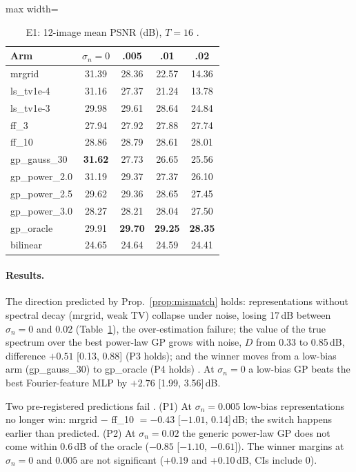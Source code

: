 \begin{table}[t]\centering\small
\caption{E1: 12-image mean PSNR (dB), $T=16$ .}\label{tab:e1}
\begin{adjustbox}{max width=\linewidth}\begin{tabular}{lcccc}\toprule
Arm & $\sigma_n{=}0$ & .005 & .01 & .02\\\midrule
mrgrid & 31.39 & 28.36 & 22.57 & 14.36\\
ls\_tv1e-4 & 31.16 & 27.37 & 21.24 & 13.78\\
ls\_tv1e-3 & 29.98 & 29.61 & 28.64 & 24.84\\
ff\_3 & 27.94 & 27.92 & 27.88 & 27.74\\
ff\_10 & 28.86 & 28.79 & 28.61 & 28.01\\
gp\_gauss\_30 & \textbf{31.62} & 27.73 & 26.65 & 25.56\\
gp\_power\_2.0 & 31.19 & 29.37 & 27.37 & 26.10\\
gp\_power\_2.5 & 29.62 & 29.36 & 28.65 & 27.45\\
gp\_power\_3.0 & 28.27 & 28.21 & 28.04 & 27.50\\
gp\_oracle & 29.91 & \textbf{29.70} & \textbf{29.25} & \textbf{28.35}\\
bilinear & 24.65 & 24.64 & 24.59 & 24.41\\
\bottomrule\end{tabular}\end{adjustbox}
\end{table}

\paragraph{Results.} The direction predicted by Prop.~\ref{prop:mismatch}
holds: representations without spectral decay (mrgrid, weak TV) collapse
under noise, losing 17\,dB between $\sigma_n=0$ and $0.02$
(Table~\ref{tab:e1}), the over-estimation failure; the value of the true
spectrum over the best power-law GP grows with noise, $D$ from 0.33 to
0.85\,dB, difference $+0.51$ [0.13, 0.88] (P3 holds); and the winner moves
from a low-bias arm (gp\_gauss\_30) to gp\_oracle (P4 holds)
. At $\sigma_n=0$ a low-bias GP beats the best
Fourier-feature MLP by $+2.76$ [1.99, 3.56]\,dB.

Two pre-registered predictions fail . (P1) At
$\sigma_n=0.005$ low-bias representations no longer win: mrgrid $-$ ff\_10 $=
-0.43$ [$-1.01$, 0.14]\,dB; the switch happens earlier than predicted.
(P2) At $\sigma_n=0.02$ the generic power-law GP does not come within 0.6\,dB of
the oracle ($-0.85$ [$-1.10$, $-0.61$]). The winner margins at $\sigma_n=0$
and $0.005$ are not significant (+0.19 and +0.10\,dB, CIs include 0).

